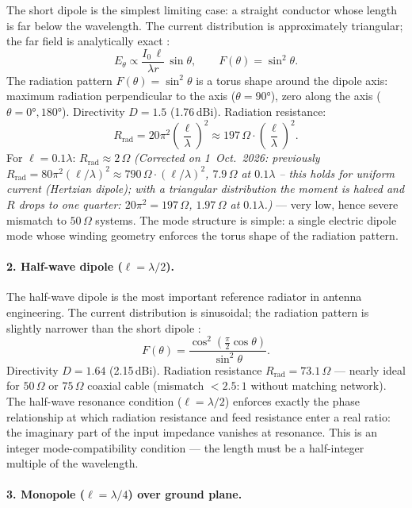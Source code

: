 The short dipole is the simplest limiting case: a straight conductor whose
length is far below the wavelength. The current distribution is
approximately triangular; the far field is analytically exact \EM:
\[
  E_\theta \propto \frac{I_0\,\ell}{\lambda r}\,\sin\theta,
  \qquad
  F(\theta) = \sin^2\theta.
\]
The radiation pattern $F(\theta) = \sin^2\theta$ is a torus shape around
the dipole axis: maximum radiation perpendicular to the axis
($\theta = 90°$), zero along the axis ($\theta = 0°, 180°$). Directivity
$D = 1.5$ (1.76\,dBi). Radiation resistance:
\[
  R_\mathrm{rad} = 20\pi^2\left(\frac{\ell}{\lambda}\right)^2 \approx 197\,\Omega
  \cdot \left(\frac{\ell}{\lambda}\right)^2.
\]
For $\ell = 0.1\lambda$: $R_\mathrm{rad} \approx 2\,\Omega$
\textit{(Corrected on 1~Oct.~2026: previously $R_\mathrm{rad} = 80\pi^2(\ell/\lambda)^2 \approx 790\,\Omega\cdot(\ell/\lambda)^2$, $7.9\,\Omega$ at $0.1\lambda$ -- this holds for uniform current (Hertzian dipole); with a triangular distribution the moment is halved and $R$ drops to one quarter: $20\pi^2 = 197\,\Omega$, $1.97\,\Omega$ at $0.1\lambda$.)} --- very low,
hence severe mismatch to $50\,\Omega$ systems. The mode structure is simple:
a single electric dipole mode whose winding geometry enforces the torus
shape of the radiation pattern.

\paragraph{2. Half-wave dipole ($\ell = \lambda/2$).}

The half-wave dipole is the most important reference radiator in antenna
engineering. The current distribution is sinusoidal; the radiation pattern
is slightly narrower than the short dipole \EM:
\[
  F(\theta) = \frac{\cos^2\!\left(\frac{\pi}{2}\cos\theta\right)}{\sin^2\theta}.
\]
Directivity $D = 1.64$ (2.15\,dBi). Radiation resistance
$R_\mathrm{rad} = 73.1\,\Omega$ --- nearly ideal for $50\,\Omega$ or
$75\,\Omega$ coaxial cable (mismatch $< 2.5:1$ without matching network).
The half-wave resonance condition ($\ell = \lambda/2$) enforces exactly
the phase relationship at which radiation resistance and feed resistance
enter a real ratio: the imaginary part of the input impedance vanishes
at resonance. This is an integer mode-compatibility condition --- the
length must be a half-integer multiple of the wavelength.

\paragraph{3. Monopole ($\ell = \lambda/4$) over ground plane.}

